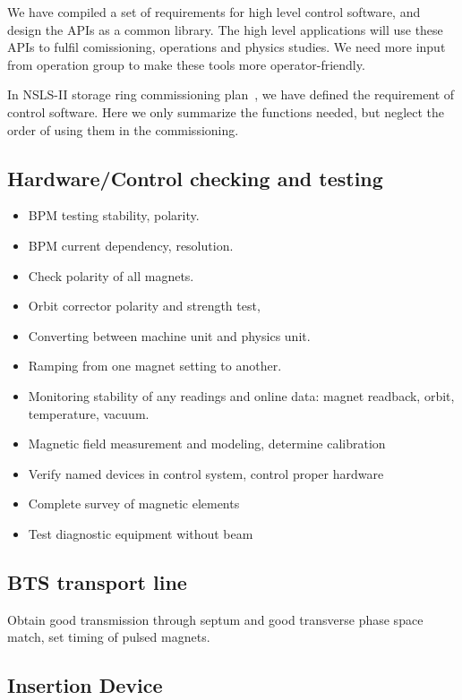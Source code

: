 \documentclass[11pt,oneside,letterpaper,showtrims,article]{memoir}
\begin{document}
We have compiled a set of requirements for high level control software,
and design the APIs as a common library. The high level applications will
use these APIs to fulfil comissioning, operations and physics studies. We
need more input from operation group to make these tools more
operator-friendly.

In NSLS-II storage ring commissioning plan~\cite{willeke_2009_assumptions,
  krinsky_2010_nsls-ii}, we have defined the requirement of control
software. Here we only summarize the functions needed, but neglect the
order of using them in the commissioning.

\subsection{Hardware/Control checking and testing}

\begin{itemize}
\item BPM testing stability, polarity.
\item BPM current dependency, resolution.
\item Check polarity of all magnets.
\item Orbit corrector polarity and strength test, 
\item Converting between machine unit and physics unit.
\item Ramping from one magnet setting to another.
\item Monitoring stability of any readings and online data: magnet
  readback, orbit, temperature, vacuum.
\item Magnetic field measurement and modeling, determine calibration
\item Verify named devices in control system, control proper hardware
\item Complete survey of magnetic elements
\item Test diagnostic equipment without beam
\end{itemize}

\subsection{BTS transport line}

Obtain good transmission through septum and good transverse phase space
match, set timing of pulsed magnets.

\subsection{Insertion Device}
\end{document}
